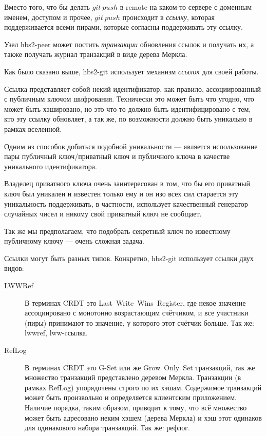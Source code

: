 \documentclass[11pt,a4paper]{article}
\newcommand{\term}[2]{\textit{#2}}
\begin{document}
Вместо того, что бы делать $git~push$ в remote на каком-то сервере с доменным именем, доступом и
прочее, $git~push$ происходит в \term{references}{ссылку}, которая поддерживается всеми пирами,
которые согласны поддерживать эту ссылку.

Узел hbs2-peer может постить \term{transaction}{транзакции} обновления ссылок и получать их, а также
получать журнал транзакций в виде дерева Меркла.

Как было сказано выше, hbs2-git использует механизм \term{references}{ссылок} для своей работы.

Ссылка представляет собой некий идентификатор, как правило, ассоциированный с публичным ключом
шифрования. Технически это может быть что угодно, что может быть хэшировано, но это что-то
должно быть идентифицировано с тем, кто эту ссылку обновляет, а так же, по возможности должно быть
уникально в рамках вселенной.

Одним из способов добиться подобной уникальности --- является использование пары публичный
ключ/приватный ключ и публичного ключа в качестве уникального идентификатора.

Владелец приватного ключа очень заинтересован в том, что бы его приватный ключ был уникален и
известен только ему и он изо всех сил старается эту уникальность поддерживать, в частности,
использует качественный генератор случайных чисел и никому свой приватный ключ не сообщает.

Так же мы предполагаем, что подобрать секретный ключ по известному публичному ключу --- очень
сложная задача.

Ссылки могут быть разных типов.  Конкретно, hbs2-git использует ссылки двух видов:

\begin{description}
  \item[LWWRef] В терминах CRDT это Last~Write~Wins~Register, где некое значение
    ассоциировано с монотонно возрастающим счётчиком, и все участники (пиры) принимают
    то значение, у которого этот счётчик больше. Так же: lwwref, lww-cсылка.

  \item[RefLog] В терминах CRDT это G-Set или же Grow~Only~Set транзакций, так же множество
    транзакций представлено деревом Меркла. Транзакции (в рамках RefLog) упорядочены строго
    по их хэшам. Содержимое транзакций может быть произвольно и определяется клиентским приложением.
    Наличие порядка, таким образом, приводит к тому, что всё множество может быть адресовано
    неким хэшем (дерева Меркла) и хэш этот одинаков для одинакового набора транзакций. Так же:
    рефлог.
\end{description}
\end{document}
